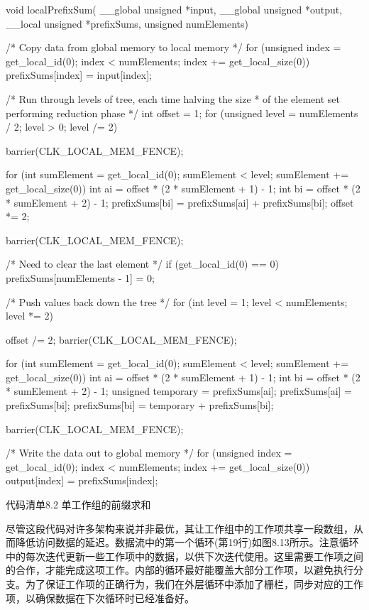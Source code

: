 \begin{codebox}[cpp]
void localPrefixSum(
  __global unsigned *input,
  __global unsigned *output,
  __local  unsigned *prefixSums,
           unsigned numElements){

  /* Copy data from global memory to local memory */
  for (unsigned index = get_local_id(0);
    index < numElements;
    index += get_local_size(0)){
    prefixSums[index] = input[index];
  }

  /* Run through levels of tree, each time halving the size
   * of the element set performing reduction phase */
  int offset = 1;
  for (unsigned level = numElements / 2;
    level > 0;
    level /= 2){
    barrier(CLK_LOCAL_MEM_FENCE);

    for (int sumElement = get_local_id(0);
        sumElement < level;
        sumElement += get_local_size(0)){
        int ai = offset * (2 * sumElement + 1) - 1;
        int bi = offset * (2 * sumElement + 2) - 1;
        prefixSums[bi] = prefixSums[ai] + prefixSums[bi];
    }
    offset *= 2;
  }

  barrier(CLK_LOCAL_MEM_FENCE);

  /* Need to clear the last element */
  if (get_local_id(0) == 0){
    prefixSums[numElements - 1] = 0;
  }

  /* Push values back down the tree */
  for (int level = 1; level < numElements; level *= 2){
    offset /= 2;
    barrier(CLK_LOCAL_MEM_FENCE);

    for (int sumElement = get_local_id(0);
        sumElement < level;
        sumElement += get_local_size(0)){
        int ai = offset * (2 * sumElement + 1) - 1;
        int bi = offset * (2 * sumElement + 2) - 1;
        unsigned temporary = prefixSums[ai];
        prefixSums[ai] = prefixSums[bi];
        prefixSums[bi] = temporary + prefixSums[bi];
    }
  }

  barrier(CLK_LOCAL_MEM_FENCE);

  /* Write the data out to global memory */
  for (unsigned index = get_local_id(0);
    index < numElements;
    index += get_local_size(0)){
    output[index] = prefixSums[index];
  }
}
\end{codebox}

代码清单8.2 单工作组的前缀求和

尽管这段代码对许多架构来说并非最优，其让工作组中的工作项共享一段数组，从而降低访问数据的延迟。数据流中的第一个循环(第19行)如图8.13所示。注意循环中的每次迭代更新一些工作项中的数据，以供下次迭代使用。这里需要工作项之间的合作，才能完成这项工作。内部的循环最好能覆盖大部分工作项，以避免执行分支。为了保证工作项的正确行为，我们在外层循环中添加了栅栏，同步对应的工作项，以确保数据在下次循环时已经准备好。

